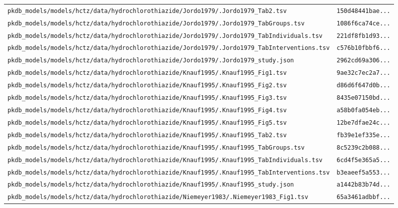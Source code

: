 \begin{longtable}{ll}
\texttt{pkdb\_models/models/hctz/data/hydrochlorothiazide/Jordo1979/.Jordo1979\_Tab2.tsv} & \texttt{150d48441bae...} \\
\texttt{pkdb\_models/models/hctz/data/hydrochlorothiazide/Jordo1979/.Jordo1979\_TabGroups.tsv} & \texttt{1086f6ca74ce...} \\
\texttt{pkdb\_models/models/hctz/data/hydrochlorothiazide/Jordo1979/.Jordo1979\_TabIndividuals.tsv} & \texttt{221df8fb1d93...} \\
\texttt{pkdb\_models/models/hctz/data/hydrochlorothiazide/Jordo1979/.Jordo1979\_TabInterventions.tsv} & \texttt{c576b10fbbf6...} \\
\texttt{pkdb\_models/models/hctz/data/hydrochlorothiazide/Jordo1979/.Jordo1979\_study.json} & \texttt{2962cd69a306...} \\
\texttt{pkdb\_models/models/hctz/data/hydrochlorothiazide/Knauf1995/.Knauf1995\_Fig1.tsv} & \texttt{9ae32c7ec2a7...} \\
\texttt{pkdb\_models/models/hctz/data/hydrochlorothiazide/Knauf1995/.Knauf1995\_Fig2.tsv} & \texttt{d86d6f647d0b...} \\
\texttt{pkdb\_models/models/hctz/data/hydrochlorothiazide/Knauf1995/.Knauf1995\_Fig3.tsv} & \texttt{8435e07150bd...} \\
\texttt{pkdb\_models/models/hctz/data/hydrochlorothiazide/Knauf1995/.Knauf1995\_Fig4.tsv} & \texttt{a58b0fa054eb...} \\
\texttt{pkdb\_models/models/hctz/data/hydrochlorothiazide/Knauf1995/.Knauf1995\_Fig5.tsv} & \texttt{12be7dfae24c...} \\
\texttt{pkdb\_models/models/hctz/data/hydrochlorothiazide/Knauf1995/.Knauf1995\_Tab2.tsv} & \texttt{fb39e1ef335e...} \\
\texttt{pkdb\_models/models/hctz/data/hydrochlorothiazide/Knauf1995/.Knauf1995\_TabGroups.tsv} & \texttt{8c5239c2b088...} \\
\texttt{pkdb\_models/models/hctz/data/hydrochlorothiazide/Knauf1995/.Knauf1995\_TabIndividuals.tsv} & \texttt{6cd4f5e365a5...} \\
\texttt{pkdb\_models/models/hctz/data/hydrochlorothiazide/Knauf1995/.Knauf1995\_TabInterventions.tsv} & \texttt{b3eaeef5a553...} \\
\texttt{pkdb\_models/models/hctz/data/hydrochlorothiazide/Knauf1995/.Knauf1995\_study.json} & \texttt{a1442b83b74d...} \\
\texttt{pkdb\_models/models/hctz/data/hydrochlorothiazide/Niemeyer1983/.Niemeyer1983\_Fig1.tsv} & \texttt{65a3461adbbf...} \\

\end{longtable}

